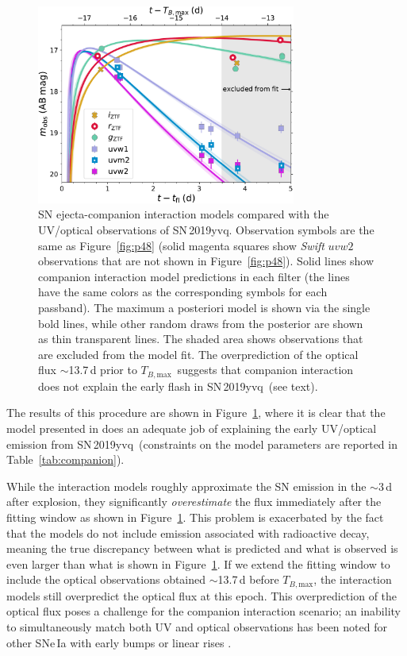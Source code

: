 \documentclass[twocolumn]{aastex63}
\newcommand{\tbmax}{$T_{B,\mathrm{max}}$}
\newcommand{\sn}{SN\,2019yvq}
\begin{document}
\begin{figure}
    \centering
    \includegraphics[width=3.35in]{./figures/sn_companion_models.pdf}
    \caption{SN ejecta-companion interaction models compared with the
    UV/optical observations of \sn. Observation symbols are the same as
    Figure~\ref{fig:p48} (solid magenta squares show \textit{Swift} $uvw2$
    observations that are not shown in Figure~\ref{fig:p48}). Solid lines show
    companion interaction model predictions in each filter (the lines have the
    same colors as the corresponding symbols for each passband). The maximum a
    posteriori model is shown via the single bold lines, while other random
    draws from the posterior are shown as thin transparent lines. The shaded
    area shows observations that are excluded from the model fit. The
    overprediction of the optical flux $\sim$13.7\,d prior to \tbmax\ suggests
    that companion interaction does not explain the early flash in \sn\ (see
    text).}
    \label{fig:companion}
\end{figure}

The results of this procedure are shown in Figure~\ref{fig:companion}, where
it is clear that the model presented in \citet{Kasen10a} does an adequate job
of explaining the early UV/optical emission from \sn\ (constraints on the
model parameters are reported in Table~\ref{tab:companion}).

While the interaction models roughly approximate the SN emission in the
$\sim$3\,d after explosion, they significantly \textit{overestimate} the flux
immediately after the fitting window as shown in Figure~\ref{fig:companion}.
This problem is exacerbated by the fact that the models do not include
emission associated with radioactive decay, meaning the true discrepancy
between what is predicted and what is observed is even larger than what is
shown in Figure~\ref{fig:companion}. If we extend the fitting window to
include the optical observations obtained $\sim$13.7\,d before \tbmax, the
interaction models still overpredict the optical flux at this epoch. This
overprediction of the optical flux poses a challenge for the companion
interaction scenario; an inability to simultaneously match both UV and optical
observations has been noted for other SNe\,Ia with early bumps or linear rises
\citep{Hosseinzadeh17,Miller18}.
\end{document}
